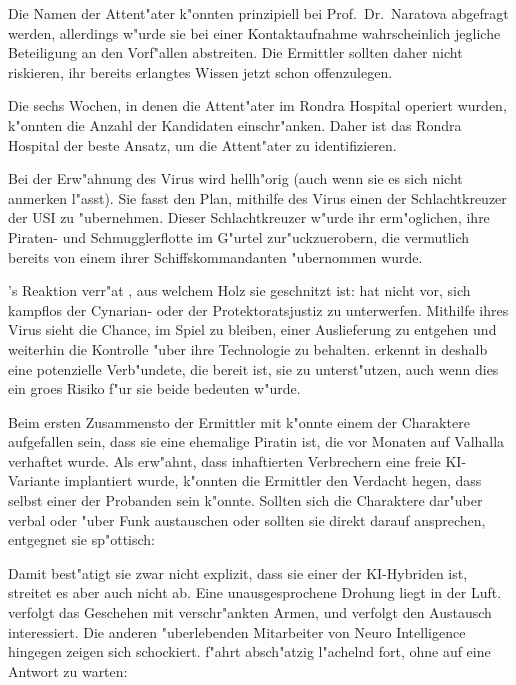 \begin{remarks}
	Die Namen der Attent"ater k"onnten prinzipiell bei Prof.~Dr.~Naratova abgefragt werden, allerdings w"urde sie bei einer Kontaktaufnahme wahrscheinlich jegliche Beteiligung an den Vorf"allen abstreiten. Die Ermittler sollten daher nicht riskieren, ihr bereits erlangtes Wissen jetzt schon offenzulegen.

	Die sechs Wochen, in denen die Attent"ater im Rondra Hospital operiert wurden, k"onnten die Anzahl der Kandidaten einschr"anken. Daher ist das Rondra Hospital der beste Ansatz, um die Attent"ater zu identifizieren.	
\end{remarks}

Bei der Erw"ahnung des Virus wird \xl{} hellh"orig (auch wenn sie es sich nicht anmerken l"asst). Sie fasst den Plan, mithilfe des Virus einen der Schlachtkreuzer der USI zu "ubernehmen. Dieser Schlachtkreuzer w"urde ihr erm"oglichen, ihre Piraten- und Schmugglerflotte im G"urtel zur"uckzuerobern, die vermutlich bereits von einem ihrer Schiffskommandanten "ubernommen wurde. 

\ml{}’s Reaktion verr"at \xl{}, aus welchem Holz sie geschnitzt ist: \ml{} hat nicht vor, sich kampflos der Cynarian- oder der Protektoratsjustiz zu unterwerfen. Mithilfe ihres Virus sieht \ml{} die Chance, im Spiel zu bleiben, einer Auslieferung zu entgehen und weiterhin die Kontrolle "uber ihre Technologie zu behalten. \xl{} erkennt in \ml{} deshalb eine potenzielle Verb"undete, die bereit ist, sie zu unterst"utzen, auch wenn dies ein gro\3es Risiko f"ur sie beide bedeuten w"urde.

Beim ersten Zusammensto\3 der Ermittler mit \xl{} k"onnte einem der Charaktere aufgefallen sein, dass sie eine ehemalige Piratin ist, die vor Monaten auf Valhalla verhaftet wurde. Als \ml{} erw"ahnt, dass inhaftierten Verbrechern eine freie KI-Variante implantiert wurde, k"onnten die Ermittler den Verdacht hegen, dass \xl{} selbst einer der Probanden sein k"onnte. Sollten sich die Charaktere dar"uber verbal oder "uber Funk austauschen oder sollten sie \xl{} direkt darauf ansprechen, entgegnet sie sp"ottisch:


Damit best"atigt sie zwar nicht explizit, dass sie einer der KI-Hybriden ist, streitet es aber auch nicht ab. Eine unausgesprochene Drohung liegt in der Luft. \ml{} verfolgt das Geschehen mit verschr"ankten Armen, und verfolgt den Austausch interessiert. Die anderen "uberlebenden Mitarbeiter von Neuro Intelligence hingegen zeigen sich schockiert. \xl{} f"ahrt absch"atzig l"achelnd fort, ohne auf eine Antwort zu warten:

